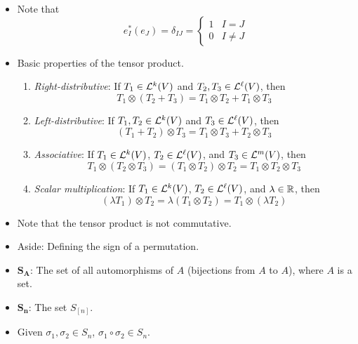 \documentclass[../notes.tex]{subfiles}
\begin{document}
\begin{itemize}
    \item Note that
    \begin{equation*}
        e_I^*(e_J) = \delta_{IJ} =
        \begin{cases}
            1 & I=J\\
            0 & I\neq J
        \end{cases}
    \end{equation*}
    \item Basic properties of the tensor product.
    \begin{enumerate}
        \item \emph{Right-distributive}: If $T_1\in\lin[k]{V}$ and $T_2,T_3\in\lin[\ell]{V}$, then
        \begin{equation*}
            T_1\otimes(T_2+T_3) = T_1\otimes T_2+T_1\otimes T_3
        \end{equation*}
        \item \emph{Left-distributive}: If $T_1,T_2\in\lin[k]{V}$ and $T_3\in\lin[\ell]{V}$, then
        \begin{equation*}
            (T_1+T_2)\otimes T_3 = T_1\otimes T_3+T_2\otimes T_3
        \end{equation*}
        \item \emph{Associative}: If $T_1\in\lin[k]{V}$, $T_2\in\lin[\ell]{V}$, and $T_3\in\lin[m]{V}$, then
        \begin{equation*}
            T_1\otimes(T_2\otimes T_3) = (T_1\otimes T_2)\otimes T_2
            = T_1\otimes T_2\otimes T_3
        \end{equation*}
        \item \emph{Scalar multiplication}: If $T_1\in\lin[k]{V}$, $T_2\in\lin[\ell]{V}$, and $\lambda\in\R$, then
        \begin{equation*}
            (\lambda T_1)\otimes T_2 = \lambda(T_1\otimes T_2)
            = T_1\otimes(\lambda T_2)
        \end{equation*}
    \end{enumerate}
    \item Note that the tensor product is not commutative.
    \item Aside: Defining the sign of a permutation.
    \item $\bm{S_A}$: The set of all automorphisms of $A$ (bijections from $A$ to $A$), where $A$ is a set.
    \item $\bm{S_n}$: The set $S_{[n]}$.
    \item Given $\sigma_1,\sigma_2\in S_n$, $\sigma_1\circ\sigma_2\in S_n$.

\end{itemize}
\end{document}
